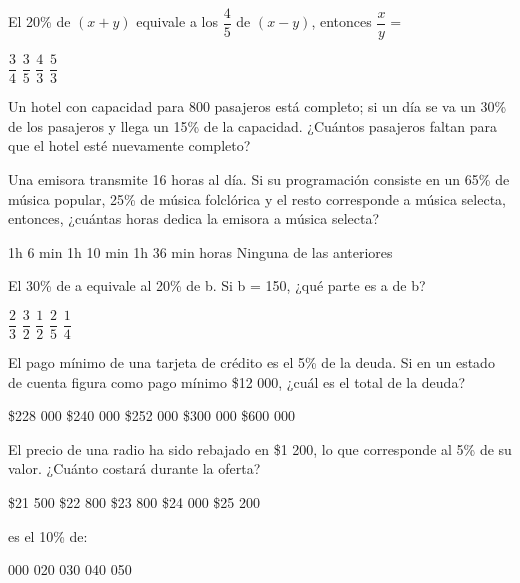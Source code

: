 \documentclass[pagina vacia]{srs}
\begin{document}
\begin{preguntas}[after-item-skip=2cm]
\pregunta El 20\% de \((x + y)\) equivale a los \(\dfrac{4}{5}\) de \((x - y)\), entonces \(\dfrac{x}{y} =\)
\begin{vertical}
\alternativa \(\dfrac{3}{4}\)
\alternativa \(\dfrac{3}{5}\)
\alternativa \(\dfrac{4}{3}\)
\alternativa \(\dfrac{5}{3}\)
\end{vertical}

\pregunta Un hotel con capacidad para 800 pasajeros está completo; si un día se va un 30\% de los pasajeros y llega un 15\% de la capacidad. ¿Cuántos pasajeros faltan para que el hotel esté nuevamente completo?
\begin{vertical}
\end{vertical}

\pregunta Una emisora transmite 16 horas al día. Si su programación consiste en un 65\% de música popular, 25\% de música folclórica y el resto corresponde a música selecta, entonces, ¿cuántas horas dedica la emisora a música selecta?
\begin{vertical}
\alternativa 1h 6 min
\alternativa 1h 10 min
\alternativa 1h 36 min
 horas
\alternativa Ninguna de las anteriores
\end{vertical}

\pregunta El 30\% de a equivale al 20\% de b. Si b = 150, ¿qué parte es a de b?
\begin{vertical}
\alternativa \(\dfrac{2}{3}\)
\alternativa \(\dfrac{3}{2}\)
\alternativa \(\dfrac{1}{2}\)
\alternativa \(\dfrac{2}{5}\)
\alternativa \(\dfrac{1}{4}\)
\end{vertical}

\pregunta El pago mínimo de una tarjeta de crédito es el 5\% de la deuda. Si en un estado de cuenta figura como pago mínimo \$12 000, ¿cuál es el total de la deuda?
\begin{vertical}
\alternativa \$228 000
\alternativa \$240 000
\alternativa \$252 000
\alternativa \$300 000
\alternativa \$600 000
\end{vertical}

\pregunta El precio de una radio ha sido rebajado en \$1 200, lo que corresponde al 5\% de su valor. ¿Cuánto costará durante la oferta?
\begin{vertical}
\alternativa \$21 500
\alternativa \$22 800
\alternativa \$23 800
\alternativa \$24 000
\alternativa \$25 200
\end{vertical}

 es el 10\% de:
\begin{vertical}
 000
 020
 030
 040
 050
\end{vertical}


\end{preguntas}
\end{document}
